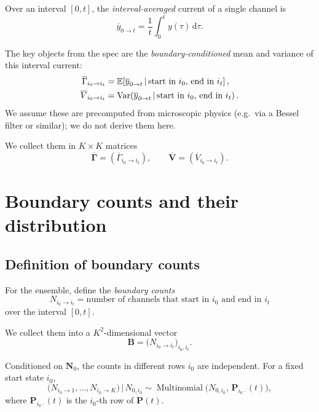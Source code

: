 \documentclass[11pt]{article}
\begin{document}
Over an interval \([0,t]\), the \emph{interval-averaged} current of a single
channel is
\[
  \overline{y}_{0\to t}
  = \frac{1}{t}\int_0^t y(\tau)\,\mathrm{d}\tau.
\]

The key objects from the spec are the \emph{boundary-conditioned} mean and
variance of this interval current:
\begin{align}
  \overline{\Gamma}_{i_0\to i_t}
  &=
  \mathbb{E}\!\left[
    \overline{y}_{0\to t}
    \,\middle|\,
    \text{start in } i_0,\,\text{end in } i_t
  \right],
  \label{eq:Gamma-def}
  \\
  \overline{V}_{i_0\to i_t}
  &=
  \operatorname{Var}\!\left(
    \overline{y}_{0\to t}
    \,\middle|\,
    \text{start in } i_0,\,\text{end in } i_t
  \right).
  \label{eq:V-def}
\end{align}
We assume these are precomputed from microscopic physics (e.g.\ via a Bessel
filter or similar); we do not derive them here.

We collect them in \(K\times K\) matrices
\[
  \overline{\mathbf{\Gamma}} = (\overline{\Gamma}_{i_0\to i_t}),
  \qquad
  \overline{\mathbf{V}} = (\overline{V}_{i_0\to i_t}).
\]


\section{Boundary counts and their distribution}

\subsection{Definition of boundary counts}

For the ensemble, define the \emph{boundary counts}
\[
  N_{i_0\to i_t}
  =
  \text{number of channels that start in } i_0 \text{ and end in } i_t
\]
over the interval \([0,t]\).

We collect them into a \(K^2\)-dimensional vector
\[
  \mathbf{B}
  =
  \bigl( N_{i_0\to i_t} \bigr)_{i_0,i_t}.
\]

Conditioned on \(\mathbf{N}_0\), the counts in different rows \(i_0\) are
independent. For a fixed start state \(i_0\),
\[
  \bigl(N_{i_0\to 1},\dots,N_{i_0\to K}\bigr)
  \,\big|\,
  N_{0,i_0}
  \sim
  \operatorname{Multinomial}\!\bigl(N_{0,i_0},\,\mathbf{P}_{i_0\cdot}(t)\bigr),
\]
where \(\mathbf{P}_{i_0\cdot}(t)\) is the \(i_0\)-th row of \(\mathbf{P}(t)\).
\end{document}
